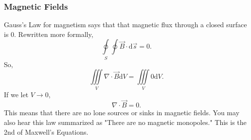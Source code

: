 \subsubsection{Magnetic Fields}
\noindent
Gauss's Law for magnetism says that that magnetic flux through a closed surface is 0. Rewritten more formally, 
\begin{equation*}
	\oint\limits_{S}\oint{\vec{B} \cdot \mathrm{d}\vec{s}} = 0.
\end{equation*}
So, 
\begin{equation*}
	\iiint\limits_{V}{\nabla \cdot \vec{B}\mathrm{d}V} = \iiint\limits_{V}{0\mathrm{d}V}.
\end{equation*}
If we let $V \to 0$, 
\begin{equation*}
	\nabla \cdot \vec{B} = 0.
\end{equation*}
This means that there are no lone sources or sinks in magnetic fields. You may also hear this law summarized as "There are no magnetic monopoles." This is the 2nd of Maxwell's Equations.